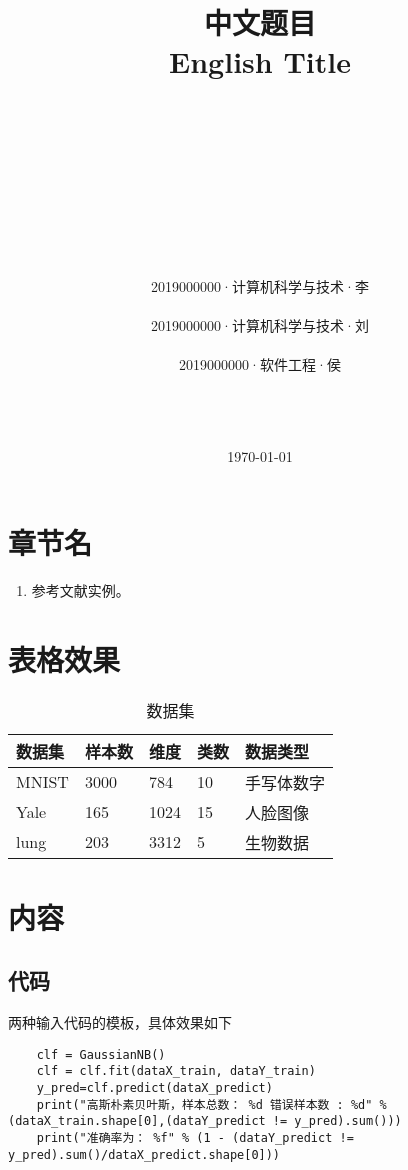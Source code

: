 \documentclass[UTF8,9pt]{ctexart}  %
\title{\heiti\fontsize{22}{\baselineskip} 中文题目 \\ \relax
\timesnewroman\fontsize{22}{\baselineskip} English Title}
\author{ \\\\\\\\\\\\\\\\\\
\fangsong\fontsize{16}{\baselineskip} 2019000000·计算机科学与技术·李 \\\\ \relax
\fangsong\fontsize{16}{\baselineskip} 2019000000·计算机科学与技术·刘 \\\\ \relax
\fangsong\fontsize{16}{\baselineskip} 2019000000·软件工程·侯	\\\\\\\\
}
\date{\today}
\begin{document}
 	\maketitle

	\newpage
	
	\section{章节名}
	\begin{enumerate}
		\item 参考文献实例。\cite{boss1997uncoupling}
	\end{enumerate}
	
	
	\section{表格效果}

	\begin{table}[htb]
		\centering
		\begin{tabular}{l l l l l}
			\hline
			
			数据集 & 样本数 & 维度 & 类数 & 数据类型 \\ \hline
			MNIST & 3000 & 784 & 10 & 手写体数字 \\ 
			Yale & 165 & 1024 & 15 & 人脸图像 \\ 
			lung & 203 & 3312 & 5 & 生物数据 \\ \hline
			
		\end{tabular}
		\caption{数据集}
	\end{table}



	\section{内容}
	
	\subsection{代码}
		两种输入代码的模板，具体效果如下
		


	\begin{lstlisting}
	clf = GaussianNB()
	clf = clf.fit(dataX_train, dataY_train)
	y_pred=clf.predict(dataX_predict)
	print("高斯朴素贝叶斯，样本总数： %d 错误样本数 : %d" % (dataX_train.shape[0],(dataY_predict != y_pred).sum()))
	print("准确率为： %f" % (1 - (dataY_predict != y_pred).sum()/dataX_predict.shape[0]))
	\end{lstlisting}
	
\end{document}
